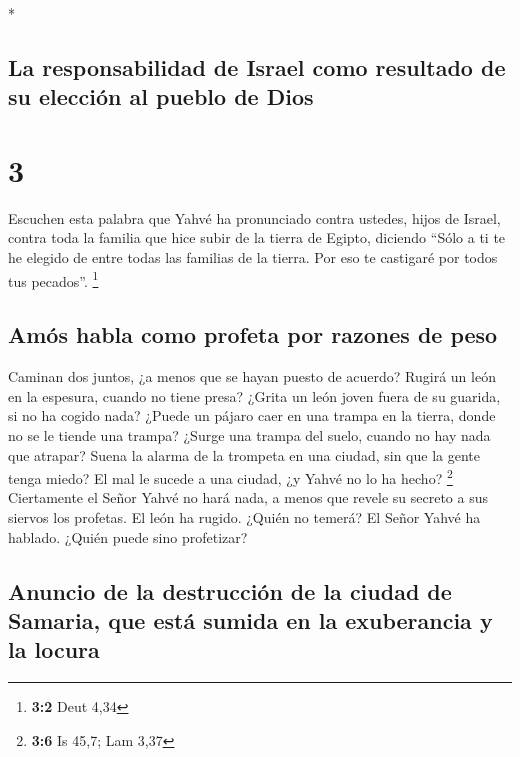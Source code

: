 \begin{paracol}{2}
\begin{otherlanguage}{english}
\end{otherlanguage}

\switchcolumn[0]*

\hypertarget{la-responsabilidad-de-israel-como-resultado-de-su-elecciuxf3n-al-pueblo-de-dios}{%
\subsection{La responsabilidad de Israel como resultado de su elección
al pueblo de
Dios}\label{la-responsabilidad-de-israel-como-resultado-de-su-elecciuxf3n-al-pueblo-de-dios}}

\hypertarget{section-4}{%
\section{3}\label{section-4}}

 Escuchen esta palabra que Yahvé ha pronunciado contra
ustedes, hijos de Israel, contra toda la familia que hice subir de la
tierra de Egipto, diciendo  ``Sólo a ti te he elegido de
entre todas las familias de la tierra. Por eso te castigaré por todos
tus pecados''. \footnote{\textbf{3:2} Deut 4,34}

\hypertarget{amuxf3s-habla-como-profeta-por-razones-de-peso}{%
\subsection{Amós habla como profeta por razones de
peso}\label{amuxf3s-habla-como-profeta-por-razones-de-peso}}

 Caminan dos juntos, ¿a menos que se hayan puesto de
acuerdo?  Rugirá un león en la espesura, cuando no tiene
presa? ¿Grita un león joven fuera de su guarida, si no ha cogido nada?
 ¿Puede un pájaro caer en una trampa en la tierra, donde
no se le tiende una trampa? ¿Surge una trampa del suelo, cuando no hay
nada que atrapar?  Suena la alarma de la trompeta en una
ciudad, sin que la gente tenga miedo? El mal le sucede a una ciudad, ¿y
Yahvé no lo ha hecho? \footnote{\textbf{3:6} Is 45,7; Lam 3,37}
 Ciertamente el Señor Yahvé no hará nada, a menos que
revele su secreto a sus siervos los profetas.  El león ha
rugido. ¿Quién no temerá? El Señor Yahvé ha hablado. ¿Quién puede sino
profetizar?

\hypertarget{anuncio-de-la-destrucciuxf3n-de-la-ciudad-de-samaria-que-estuxe1-sumida-en-la-exuberancia-y-la-locura}{%
\subsection{Anuncio de la destrucción de la ciudad de Samaria, que está
sumida en la exuberancia y la
locura}\label{anuncio-de-la-destrucciuxf3n-de-la-ciudad-de-samaria-que-estuxe1-sumida-en-la-exuberancia-y-la-locura}}


\end{paracol}
